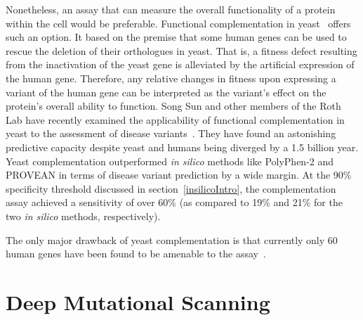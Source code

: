 Nonetheless, an assay that can measure the overall functionality of a protein within the cell would be preferable. Functional complementation in yeast~\cite{lee_complementation_1987,osborn_rescuing_2007} offers such an option. It based on the premise that some human genes can be used to rescue the deletion of their orthologues in yeast. That is, a fitness defect resulting from the inactivation of the yeast gene is alleviated by the artificial expression of the human gene. Therefore, any relative changes in fitness upon expressing a variant of the human gene can be interpreted as the variant's effect on the protein's overall ability to function. Song Sun and other members of the Roth Lab have recently examined the applicability of functional complementation in yeast to the assessment of disease variants~\cite{sun_extended_2016}. They have found an astonishing predictive capacity despite yeast and humans being diverged by a 1.5 billion year. Yeast complementation outperformed \textit{in silico} methods like PolyPhen-2 and PROVEAN in terms of disease variant prediction by a wide margin. At the 90\% specificity threshold discussed in section~\ref{insilicoIntro}, the complementation assay achieved a sensitivity of over 60\% (as compared to 19\% and 21\% for the two \textit{in silico} methods, respectively).

The only major drawback of yeast complementation is that currently only 60 human genes have been found to be amenable to the assay~\cite{sun_extended_2016}. %



\section{Deep Mutational Scanning}

